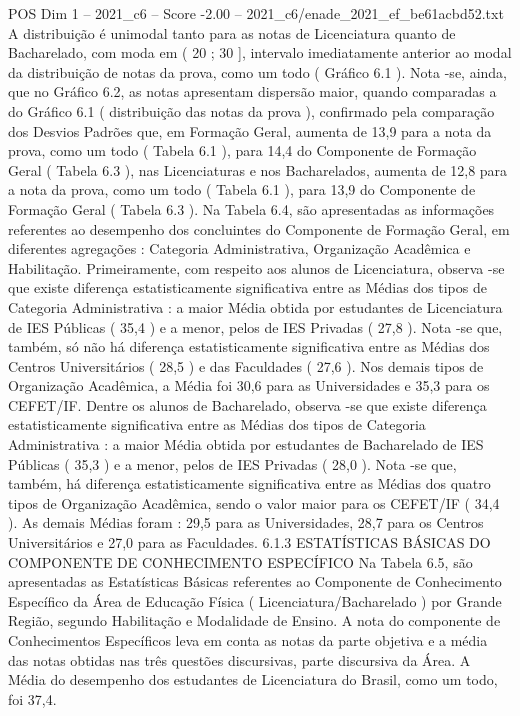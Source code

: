 \begin{textsample}{POS Dim 1 – 2021\_c6 – Score -2.00 – 2021\_c6/enade\_2021\_ef\_be61acbd52.txt}
A distribuição é unimodal tanto para as notas de Licenciatura quanto de Bacharelado, com moda em ( 20 ; 30 ], intervalo imediatamente anterior ao modal da distribuição de notas da prova, como um todo ( Gráfico 6.1 ).
Nota -se, ainda, que no Gráfico 6.2, as notas apresentam dispersão maior, quando comparadas a do Gráfico 6.1 ( distribuição das notas da prova ), confirmado pela comparação dos Desvios Padrões que, em Formação Geral, aumenta de 13,9 para a nota da prova, como um todo ( Tabela 6.1 ), para 14,4 do Componente de Formação Geral ( Tabela 6.3 ), nas Licenciaturas e nos Bacharelados, aumenta de 12,8 para a nota da prova, como um todo ( Tabela 6.1 ), para 13,9 do Componente de Formação Geral ( Tabela 6.3 ).
Na Tabela 6.4, são apresentadas as informações referentes ao desempenho dos concluintes do Componente de Formação Geral, em diferentes agregações : Categoria Administrativa, Organização Acadêmica e Habilitação.
Primeiramente, com respeito aos alunos de Licenciatura, observa -se que existe diferença estatisticamente significativa entre as Médias dos tipos de Categoria Administrativa : a maior Média obtida por estudantes de Licenciatura de IES Públicas ( 35,4 ) e a menor, pelos de IES Privadas ( 27,8 ).
Nota -se que, também, só não há diferença estatisticamente significativa entre as Médias dos Centros Universitários ( 28,5 ) e das Faculdades ( 27,6 ).
Nos demais tipos de Organização Acadêmica, a Média foi 30,6 para as Universidades e 35,3 para os CEFET/IF.
Dentre os alunos de Bacharelado, observa -se que existe diferença estatisticamente significativa entre as Médias dos tipos de Categoria Administrativa : a maior Média obtida por estudantes de Bacharelado de IES Públicas ( 35,3 ) e a menor, pelos de IES Privadas ( 28,0 ).
Nota -se que, também, há diferença estatisticamente significativa entre as Médias dos quatro tipos de Organização Acadêmica, sendo o valor maior para os CEFET/IF ( 34,4 ).
As demais Médias foram : 29,5 para as Universidades, 28,7 para os Centros Universitários e 27,0 para as Faculdades. 6.1.3 ESTATÍSTICAS BÁSICAS DO COMPONENTE DE CONHECIMENTO ESPECÍFICO Na Tabela 6.5, são apresentadas as Estatísticas Básicas referentes ao Componente de Conhecimento Específico da Área de Educação Física ( Licenciatura/Bacharelado ) por Grande Região, segundo Habilitação e Modalidade de Ensino.
A nota do componente de Conhecimentos Específicos leva em conta as notas da parte objetiva e a média das notas obtidas nas três questões discursivas, parte discursiva da Área.
A Média do desempenho dos estudantes de Licenciatura do Brasil, como um todo, foi 37,4.

\end{textsample}
